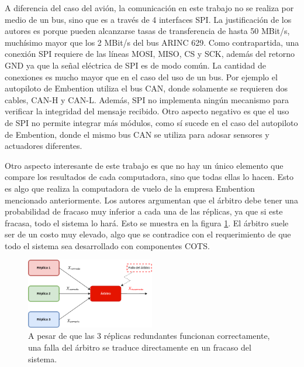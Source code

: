 A diferencia del caso del avión, la comunicación en este trabajo no se realiza por medio de un bus, sino que es a través de 4 interfaces SPI. La justificación de los autores es porque pueden alcanzarse tasas de transferencia de hasta 50 MBit/s, muchísimo mayor que los 2 MBit/s del bus ARINC 629. Como contrapartida, una conexión SPI requiere de las líneas MOSI, MISO, CS y SCK, además del retorno GND ya que la señal eléctrica de SPI es de modo común. La cantidad de conexiones es mucho mayor que en el caso del uso de un bus. Por ejemplo el autopiloto de Embention utiliza el bus CAN, donde solamente se requieren dos cables, CAN-H y CAN-L. Además, SPI no implementa ningún mecanismo para verificar la integridad del mensaje recibido. Otro aspecto negativo es que el uso de SPI no permite integrar más módulos, como sí sucede en el caso del autopiloto de Embention, donde el mismo bus CAN se utiliza para adosar sensores y actuadores diferentes.


Otro aspecto interesante de este trabajo es que no hay un único elemento que compare los resultados de cada computadora, sino que todas ellas lo hacen. Esto es algo que realiza la computadora de vuelo de la empresa Embention mencionado anteriormente. Los autores argumentan que el árbitro debe tener una probabilidad de fracaso muy inferior a cada una de las réplicas, ya que si este fracasa, todo el sistema lo hará. Esto se muestra en la figura \ref{fig:falla_arbitro}. El árbitro suele ser de un costo muy elevado, algo que se contradice con el requerimiento de que todo el sistema sea desarrollado con componentes COTS.

\begin{figure}[H]
    \centering
    \includegraphics[width=0.5\textwidth]{img/falla_arbitro.png}
    \caption{A pesar de que las 3 réplicas redundantes funcionan correctamente, una falla del árbitro se traduce directamente en un fracaso del sistema.}
    \label{fig:falla_arbitro}
\end{figure}

